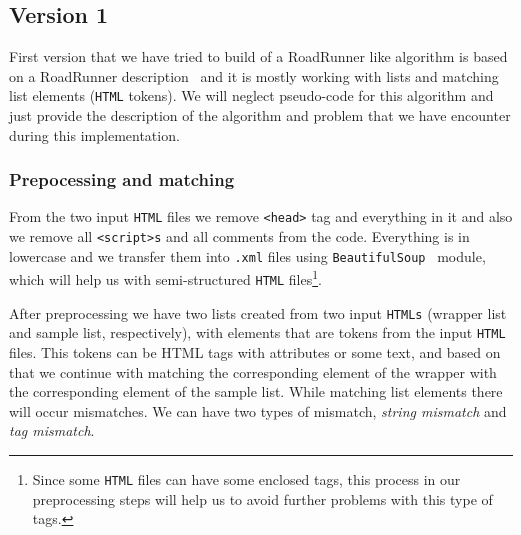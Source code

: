 \documentclass{article}
\begin{document}
	\subsection{Version 1}\label{v1}
	
	First version that we have tried to build of a RoadRunner like algorithm is based on a RoadRunner description~\cite{crescenzi2001roadrunner} and it is mostly working with lists and matching list elements (\texttt{HTML} tokens). We will neglect pseudo-code for this algorithm and just provide the description of the algorithm and problem that we have encounter during this implementation.
	
	\subsubsection{Prepocessing and matching}
	From the two input \texttt{HTML} files we remove \texttt{<head>} tag and everything in it and also we remove all \texttt{<script>s} and all comments from the code. Everything is in lowercase and we transfer them into \texttt{.xml} files using \texttt{BeautifulSoup}~\cite{BeautifulSoup} module, which will help us with semi-structured \texttt{HTML} files\footnote{Since some \texttt{HTML} files can have some enclosed tags, this process in our preprocessing steps will help us to avoid further problems with this type of tags.}. 
	
	After preprocessing we have two lists created from two input \texttt{HTMLs} (wrapper list and sample list, respectively), with elements that are tokens from the input \texttt{HTML} files. This tokens can be HTML tags with attributes or some text, and based on that we continue with matching the corresponding element of the wrapper with the corresponding element of the sample list. While matching list elements there will occur mismatches. We can have two types of mismatch, \textit{string mismatch} and \textit{tag mismatch}. 
	
\end{document}
